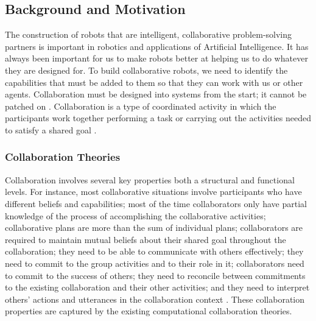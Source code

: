 \documentclass[a4paper, 11pt]{article}
\begin{document}
\begin{small}
\vspace*{-4mm}
\section*{Background and Motivation}
\vspace*{-2mm}
The construction of robots that are intelligent, collaborative problem-solving
partners is important in robotics and applications of Artificial Intelligence.
It has always been important for us to make robots better at helping us to do
whatever they are designed for. To build collaborative robots, we need to
identify the capabilities that must be added to them so that they can work with
us or other agents. Collaboration must be designed into systems from the start;
it cannot be patched on \cite{grosz:collaborative-systems}. Collaboration is a
type of coordinated activity in which the participants work together performing
a task or carrying out the activities needed to satisfy a shared goal
\cite{grosz:collaboration}.
\vspace*{-4mm}
\subsubsection*{Collaboration Theories}
Collaboration involves several key properties both a structural and functional
levels. For instance, most collaborative situations involve participants who
have different beliefs and capabilities; most of the time collaborators only
have partial knowledge of the process of accomplishing the collaborative
activities; collaborative plans are more than the sum of individual plans;
collaborators are required to maintain mutual beliefs about their shared goal
throughout the collaboration; they need to be able to communicate with others
effectively; they need to commit to the group activities and to their role in
it; collaborators need to commit to the success of others; they need to
reconcile between commitments to the existing collaboration and their other
activities; and they need to interpret others' actions and utterances in the
collaboration context \cite{grosz:mice-menus}. These collaboration properties
are captured by the existing computational collaboration theories.


\end{small}
\end{document}
